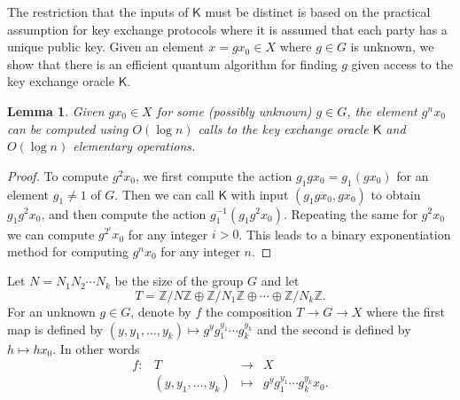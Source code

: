 \documentclass[11pt]{article}
\theoremstyle{plain}
\newtheorem{lemma}[theorem]{Lemma}
\theoremstyle{definition}
\def\Z{\mathbb{Z}}
\newcommand{\kex}{\mathsf{K}}
\begin{document}
The restriction that the inputs of $\kex$ must be distinct is based on the practical assumption for 
key exchange protocols where it is assumed that each party has a unique public key. Given an element 
$x = gx_0 \in X$ where $g \in G$ is unknown, we show that there is an efficient quantum algorithm 
for finding $g$ given access to the key exchange oracle $\kex$.

\begin{lemma}
\label{lem:kex-pow}
	Given $gx_0 \in X$ for some (possibly unknown) $g \in G$, the element $g^nx_0$ can be computed 
	using $O(\log n)$ calls to the key exchange oracle $\kex$ and $O(\log n)$ elementary operations.
\end{lemma}
\begin{proof}
	To compute $g^2x_0$, we first compute the action $g_1gx_0 = g_1(gx_0)$ for an element $g_1 \ne 
	1$ of $G$. Then we can call $\kex$ with input $(g_1gx_0, gx_0)$ to obtain $g_1g^2x_0$, and then 
	compute the action $g_1^{-1}(g_1g^2x_0)$. Repeating the same for $g^2x_0$ we can compute 
	$g^{2^i}x_0$ for any integer $i > 0$. This leads to a binary exponentiation method for computing 
	$g^nx_0$ for any integer $n$.
\end{proof}

Let $N = N_1N_2 \cdots N_k$ be the size of the group $G$ and let 
\[ T = \Z / N \Z \oplus \Z / N_1 \Z \oplus \cdots \oplus \Z / N_k \Z. \]
For an unknown $g \in G$, denote by $f$ the composition $ T \rightarrow G \rightarrow X$ where the 
first map is defined by $(y, y_1, \dots, y_k) \mapsto g^y g_1^{y_1} \cdots g_k^{y_k}$ and the second 
is defined by $h \mapsto hx_0$. In other words
\begin{equation}
\label{equ:map-f}
	\begin{array}{lrll}
		f: & T & \longrightarrow & X \\
		& (y, y_1, \dots, y_k) & \longmapsto & g^y g_1^{y_1} \cdots g_k^{y_k} x_0.
	\end{array}
\end{equation}
\end{document}
